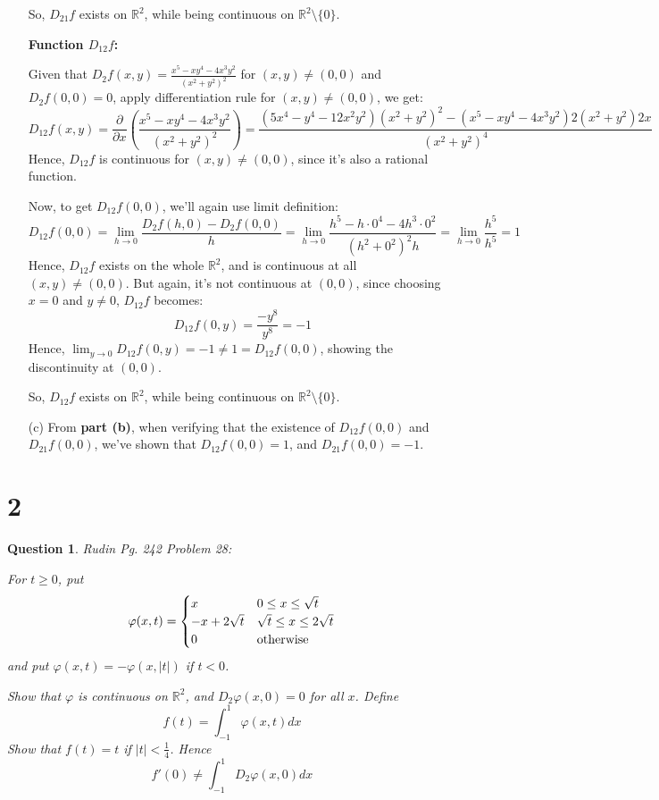 \documentclass{article}
\newtheorem{question}{Question}
\begin{document}
\begin{itemize}
    So, $D_{21}f$ exists on $\mathbb{R}^2$, while being continuous on $\mathbb{R}^2\setminus\{0\}$.

    \hfil

    \textbf{Function $D_{12}f$:}

    Given that $D_{2}f(x,y)=\frac{x^5-xy^4-4x^3y^2}{(x^2+y^2)^2}$ for $(x,y)\neq (0,0)$ and $D_2f(0,0)=0$, apply differentiation rule for $(x,y)\neq (0,0)$, we get:
    $$D_{12}f(x,y)=\frac{\partial}{\partial x}\left(\frac{x^5-xy^4-4x^3y^2}{(x^2+y^2)^2}\right) = \frac{(5x^4-y^4-12x^2y^2)(x^2+y^2)^2-(x^5-xy^4-4x^3y^2)2(x^2+y^2)2x}{(x^2+y^2)^4}$$
    Hence, $D_{12}f$ is continuous for $(x,y)\neq (0,0)$, since it's also a rational function.

    Now, to get $D_{12}f(0,0)$, we'll again use limit definition:
    $$D_{12}f(0,0)=\lim_{h\rightarrow 0}\frac{D_2f(h,0)-D_2f(0,0)}{h} = \lim_{h\rightarrow 0}\frac{h^5-h\cdot 0^4-4h^3\cdot 0^2}{(h^2+0^2)^2h} = \lim_{h\rightarrow 0}\frac{h^5}{h^5} = 1$$
    Hence, $D_{12}f$ exists on the whole $\mathbb{R}^2$, and is continuous at all $(x,y)\neq (0,0)$. But again, it's not continuous at $(0,0)$, since choosing $x=0$ and $y\neq 0$, $D_{12}f$ becomes:
    $$D_{12}f(0,y)=\frac{-y^8}{y^8}=-1$$
    Hence, $\lim_{y\rightarrow 0}D_{12}f(0,y) = -1 \neq 1 = D_{12}f(0,0)$, showing the discontinuity at $(0,0)$.

    So, $D_{12}f$ exists on $\mathbb{R}^2$, while being continuous on $\mathbb{R}^2\setminus\{0\}$.

    \hfil
    
    \hfil

    \item[(c)] From \textbf{part (b)}, when verifying that the existence of $D_{12}f(0,0)$ and $D_{21}f(0,0)$, we've shown that $D_{12}f(0,0)=1$, and $D_{21}f(0,0)=-1$.
\end{itemize}

\break

\section*{2}
\begin{myBox}[]{}
    \begin{question}
        Rudin Pg. 242 Problem 28:

        For $t\geq 0$, put 
        $$\varphi(x,t)=\begin{cases}
            x & 0\leq x\leq \sqrt{t}\\
            -x+2\sqrt{t} & \sqrt{t}\leq x\leq 2\sqrt{t}\\
            0 & \textmd{otherwise}
        \end{cases}$$
        and put $\varphi(x,t)=-\varphi(x,|t|)$ if $t<0$.

        Show that $\varphi$ is continuous on $\mathbb{R}^2$, and $D_2\varphi(x,0)=0$ for all $x$. Define 
        $$f(t)=\int_{-1}^{1}\varphi(x,t)dx$$
        Show that $f(t)=t$ if $|t|<\frac{1}{4}$. Hence 
        $$f'(0)\neq \int_{-1}^{1}D_2\varphi(x,0)dx$$
    \end{question}
\end{myBox}
\end{document}
